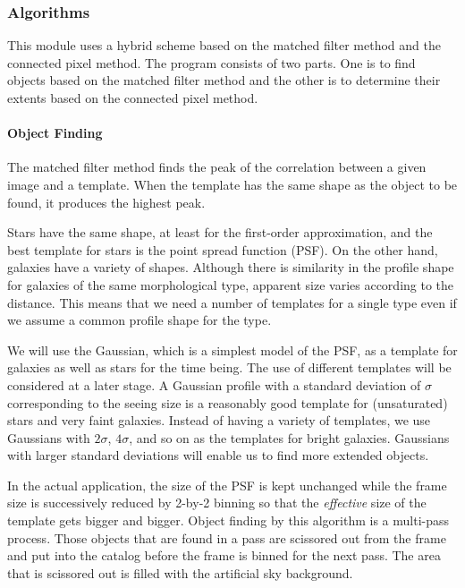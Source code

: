 \subsubsection{Algorithms}

This module uses a hybrid scheme based on the matched filter method
and the connected pixel method. The program consists of two parts. One
is to find objects based on the matched filter method and the other is
to determine their extents based on the connected pixel method.

\paragraph{Object Finding}

The matched filter method finds the peak of the correlation between a
given image and a template. When the template has the same shape as
the object to be found, it produces the highest peak.

Stars have the same shape, at least for the first-order approximation,
and the best template for stars is the point spread function (PSF).
On the other hand, galaxies have a variety of shapes. Although there
is similarity in the profile shape for galaxies of the same
morphological type, apparent size varies according to the
distance. This means that we need a number of templates for a single
type even if we assume a common profile shape for the type.

We will use the Gaussian, which is a simplest model of the PSF, as a
template for galaxies as well as stars for the time being. The use of
different templates will be considered at a later stage. A Gaussian
profile with a standard deviation of $\sigma$ corresponding to the
seeing size is a reasonably good template for (unsaturated) stars and
very faint galaxies. Instead of having a variety of templates, we use
Gaussians with $2\sigma$, $4\sigma$, and so on as the templates for
bright galaxies. Gaussians with larger standard deviations will enable
us to find more extended objects.

In the actual application, the size of the PSF is kept unchanged while
the frame size is successively reduced by 2-by-2 binning so that the
{\it effective} size of the template gets bigger and bigger. Object
finding by this algorithm is a multi-pass process. Those objects that
are found in a pass are scissored out from the frame and put into the
catalog before the frame is binned for the next pass.  The area that
is scissored out is filled with the artificial sky background.

